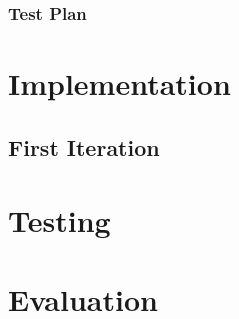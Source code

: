 \documentclass{article}
\begin{document}
\subsubsection{Test Plan}

\section{Implementation}

\subsection{First Iteration}

\section{Testing}

\section{Evaluation}
\end{document}
